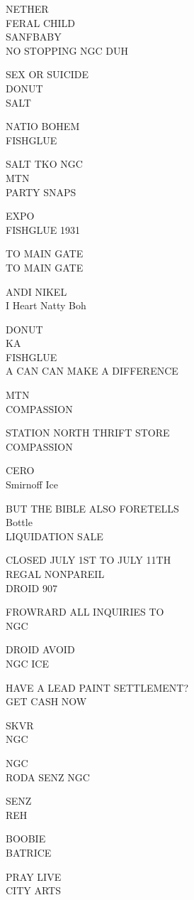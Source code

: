 \documentclass[10pt,letterpaper]{article}
\begin{document}
NETHER\\
FERAL CHILD\\
SANFBABY\\
NO STOPPING NGC DUH

SEX OR SUICIDE\\
DONUT\\
SALT

NATIO BOHEM\\
FISHGLUE

SALT TKO NGC\\
MTN\\
PARTY SNAPS

EXPO\\
FISHGLUE 1931

TO MAIN GATE\\
TO MAIN GATE

ANDI NIKEL\\
I Heart Natty Boh

DONUT\\
KA\\
FISHGLUE\\
A CAN CAN MAKE A DIFFERENCE

MTN\\
COMPASSION

STATION NORTH THRIFT STORE\\
COMPASSION

CERO\\
Smirnoff Ice

BUT THE BIBLE ALSO FORETELLS\\
Bottle\\
LIQUIDATION SALE

CLOSED JULY 1ST TO JULY 11TH\\
REGAL NONPAREIL\\
DROID 907

FROWRARD ALL INQUIRIES TO\\
NGC

DROID AVOID\\
NGC ICE

HAVE A LEAD PAINT SETTLEMENT?\\
GET CASH NOW

SKVR\\
NGC

NGC\\
RODA SENZ NGC

SENZ\\
REH

BOOBIE\\
BATRICE

PRAY LIVE\\
CITY ARTS
\end{document}
